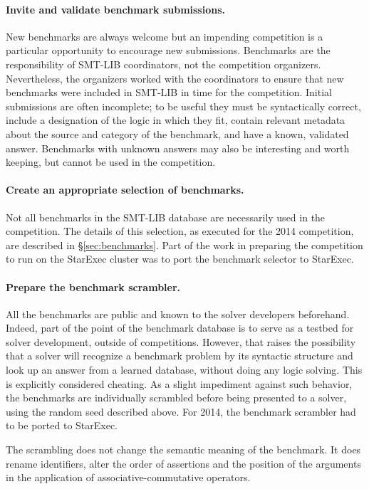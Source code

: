 \documentclass[twoside,11pt]{article}
\begin{document}
\paragraph{Invite and validate benchmark submissions.} New benchmarks are always welcome but an impending competition is a particular opportunity to encourage new submissions. Benchmarks are the responsibility of SMT-LIB coordinators, not the competition organizers. Nevertheless, the organizers worked with the coordinators to ensure that new benchmarks were included in SMT-LIB in time for the competition. Initial submissions are often incomplete; to be useful they must be syntactically correct, include a designation of the logic in which they fit, contain relevant metadata about the source and category of the benchmark, and have a known, validated answer. Benchmarks with unknown answers may also be interesting and worth keeping, but cannot be used in the competition.

\paragraph{Create an appropriate selection of benchmarks.} Not all benchmarks in the SMT-LIB database are necessarily used in the competition. The details of this selection, as executed for the 2014 competition, are described in \S\ref{sec:benchmarks}. Part of the work in preparing the competition to run on the StarExec cluster was to port the benchmark selector to StarExec.

\paragraph{Prepare the benchmark scrambler.} All the benchmarks are public and known to the solver developers beforehand. Indeed, part of the point of the benchmark database is to serve as a testbed for solver development, outside of competitions. However, that raises the possibility that a solver will recognize a benchmark problem by its syntactic structure and look up an answer from a learned database, without doing any logic solving. This is explicitly considered cheating. As a slight impediment against such behavior, the benchmarks are individually scrambled before being presented to a solver, using the random seed described above. For 2014, the benchmark scrambler had to be ported to StarExec.

The scrambling does not change the semantic meaning of the benchmark. It does rename identifiers, alter the order of assertions and the position of the arguments in the application of associative-commutative operators.
\end{document}
